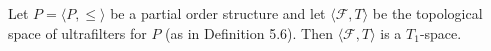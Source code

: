 Let $P = \langle P, \leq \rangle$ be a partial order structure and let $\langle \mathcal{F}, T \rangle$ be the topological space of ultrafilters for $P$ (as in Definition 5.6). Then $\langle \mathcal{F}, T \rangle$ is a $T_1$-space.
